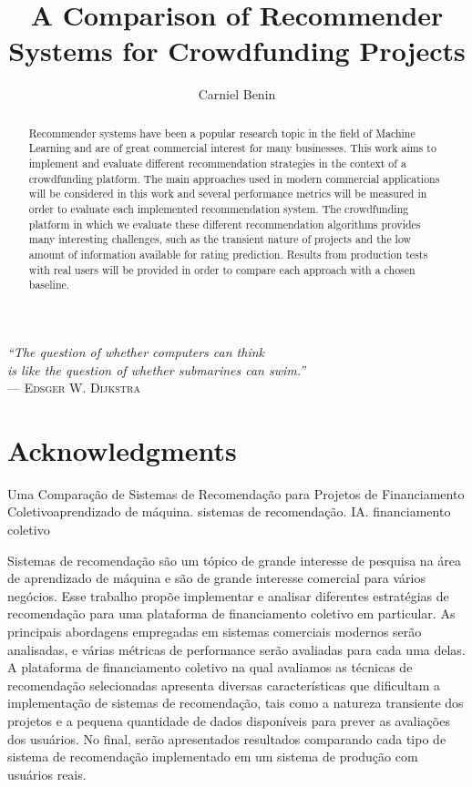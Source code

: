 \documentclass[cic,tc,english]{iiufrgs}
\title{A Comparison of Recommender Systems for Crowdfunding Projects}
\author{Carniel Benin}{Adriano}
\begin{document}
\maketitle

\clearpage
\begin{flushright}
    \mbox{}\vfill
    {\sffamily\itshape
      ``The question of whether computers can think\\
      is like the question of whether submarines can swim.''\\}
    --- \textsc{Edsger W. Dijkstra}
\end{flushright}

\chapter*{Acknowledgments}
\begin{abstract}
    Recommender systems have been a popular research topic in the field of Machine Learning and are of great commercial interest for many businesses. This work aims to implement and evaluate different recommendation strategies in the context of a crowdfunding platform. The main approaches used in modern commercial applications will be considered in this work and several performance metrics will be measured in order to evaluate each implemented recommendation system. The crowdfunding platform in which we evaluate these different recommendation algorithms provides many interesting challenges, such as the transient nature of projects and the low amount of information available for rating prediction. Results from production tests with real users will be provided in order to compare each approach with a chosen baseline.
\end{abstract}
\begin{englishabstract}{Uma Comparação de Sistemas de Recomendação para Projetos de Financiamento Coletivo}{aprendizado de máquina. sistemas de recomendação. IA. financiamento coletivo}

Sistemas de recomendação são um tópico de grande interesse de pesquisa na área de aprendizado de máquina e são de grande interesse comercial para vários negócios. Esse trabalho propõe implementar e analisar diferentes estratégias de recomendação para uma plataforma de financiamento coletivo em particular. As principais abordagens empregadas em sistemas comerciais modernos serão analisadas, e várias métricas de performance serão avaliadas para cada uma delas. A plataforma de financiamento coletivo na qual avaliamos as técnicas de recomendação selecionadas apresenta diversas características que dificultam a implementação de sistemas de recomendação, tais como a natureza transiente dos projetos e a pequena quantidade de dados disponíveis para prever as avaliações dos usuários. No final, serão apresentados resultados comparando cada tipo de sistema de recomendação implementado em um sistema de produção com usuários reais. 
\end{englishabstract}
\end{document}
